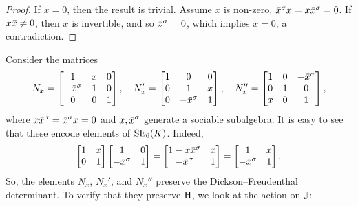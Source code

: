 \begin{proof}
	If $x = 0$, then the result is trivial. Assume $x$ is non-zero, $\ovx^{\s} x = x\ovx^{\s} = 0$.
	If $x \mathord{\mbox{\hspace*{0pt}}\,\overline{\!x\!\!\;}\!\:}\mbox{\hspace*{0pt}} \neq 0$, then $x$ is invertible, and so $\mathord{\mbox{\hspace*{0pt}}\,\overline{\!x\!\!\;}\!\:}\mbox{\hspace*{0pt}}^{\sigma} = 0$, which implies $x = 0$, a 
	contradiction.
\end{proof}

Consider the matrices
\begin{equation}
	N_x = \begin{bmatrix}
		1 & x & 0 \\
		-\ovx^{\s} & 1 & 0 \\
		0 & 0 & 1
	\end{bmatrix},\quad
	N_x' = \begin{bmatrix}
		1 & 0 & 0 \\
		0 & 1 & x \\
		0 & -\ovx^{\s} & 1
	\end{bmatrix},\quad
	N_x'' = \begin{bmatrix}
		1 & 0 & -\ovx^{\s} \\
		0 & 1 & 0 \\
		x & 0 & 1
	\end{bmatrix},
\end{equation}
where $x\ovx^{\s} = \ovx^{\s}x = 0$ and $x,\mathord{\mbox{\hspace*{0pt}}\,\overline{\!x\!\!\;}\!\:}\mbox{\hspace*{0pt}}^{\sigma}$ generate a sociable subalgebra. 
It is easy to see that these encode elements of $\mathrm{SE}_6(K)$. Indeed,
\begin{equation}
	\begin{bmatrix}
		1 & x \\
		0 & 1
	\end{bmatrix}
	\begin{bmatrix}
		1 & 0 \\
		-\ovx ^{\s} & 1
	\end{bmatrix} = 
	\begin{bmatrix}
		1 - x\ovx ^{\s} & x \\
		-\ovx ^{\s} & 1 
	\end{bmatrix} = 
	\begin{bmatrix}
		1 & x \\
		-\ovx ^{\s} & 1
	\end{bmatrix}.
\end{equation}
So, the elements $N_x$, $N_x'$, and $N_x''$ preserve the Dickson--Freudenthal determinant. 
To verify that they preserve $\mathrm{H}$, we look at the action on $\mathbb{J}$:
